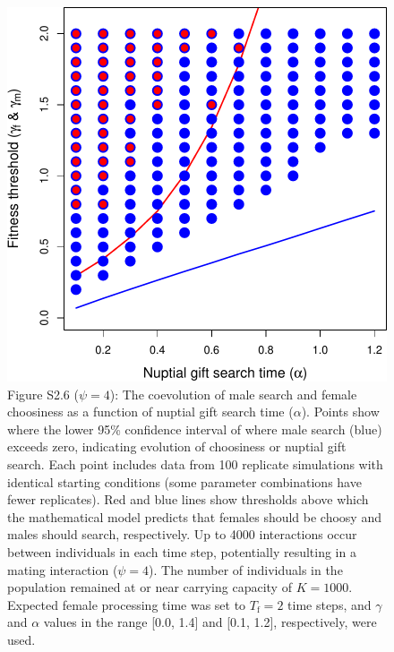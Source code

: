 \documentclass[
]{article}
\begin{document}
\captionsetup{labelformat=default}

\clearpage

\captionsetup{labelformat=empty}

\begin{figure}
\centering
\includegraphics{ms_biorxiv_files/figure-latex/unnamed-chunk-11-1.pdf}
\caption{Figure S2.6 (\(\psi = 4\)): The coevolution of male search and
female choosiness as a function of nuptial gift search time
(\(\alpha\)). Points show where the lower 95\% confidence interval of
where male search (blue) exceeds zero, indicating evolution of
choosiness or nuptial gift search. Each point includes data from 100
replicate simulations with identical starting conditions (some parameter
combinations have fewer replicates). Red and blue lines show thresholds
above which the mathematical model predicts that females should be
choosy and males should search, respectively. Up to 4000 interactions
occur between individuals in each time step, potentially resulting in a
mating interaction (\(\psi = 4\)). The number of individuals in the
population remained at or near carrying capacity of \(K = 1000\).
Expected female processing time was set to \(T_{\mathrm{f}}=2\) time
steps, and \(\gamma\) and \(\alpha\) values in the range {[}0.0, 1.4{]}
and {[}0.1, 1.2{]}, respectively, were used.}
\end{figure}
\end{document}

